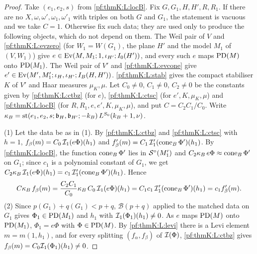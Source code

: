 \begin{proof}
Take $(e_1,e_2,s)$ from \ref{pf:thmK:L:locB}. Fix $G,G_1,H,H',R,R_1$. If there are no $X,\omega,\omega',\omega_1,
\omega'_1$ with triples on both $G$ and $G_1$, the statement is vacuous and we take $C=1$. Otherwise fix such data; they
are used only to produce the following objects, which do not depend on them. The Weil pair of $V$ and
\ref{pf:thmK:L:evzero} (for $W_1=W(G_1)$, the plane $H'$ and the model $M_1$ of $(V,W_1)$) give
$e\in\operatorname{Ev}(M,M_1;1,\iota_{H'};I_0(H'))$, and every such $e$ maps $\operatorname{PD}(M)$ onto $\operatorname{PD}(M_1)$. The Weil pair of $V'$
and \ref{pf:thmK:L:evcone} give $e'\in\operatorname{Ev}(M',M'_1;\iota_H,\iota_{H'};I_B(H,H'))$. \ref{pf:thmK:L:stab} gives the
compact stabiliser $K$ of $V'$ and Haar measures $\mu_K,\mu$. Let $C_0\ne0$, $C_1\ne0$, $C_2\ne0$ be the constants given by
\ref{pf:thmK:L:ctbz} (for $e$), \ref{pf:thmK:L:ctsc} (for $e',K,\mu_K,\mu$) and \ref{pf:thmK:L:locB} (for
$R,R_1,e,e',K,\mu_K,\mu$), and put $C=C_2C_1/C_0$. Write $\kappa_B=\operatorname{st}(e_1,e_2,s;\mathfrak b_H,\mathfrak
b_{H'};-k_B)\,L^{S_0}(k_B+1,\nu)$.

(1) Let the data be as in (1). By \ref{pf:thmK:L:ctbz} and \ref{pf:thmK:L:ctsc} with $h=1$,
$f_\beta(m)=C_0\,\mathcal{I}_1(e\Phi)(h_1)$ and $f'_\beta(m)=C_1\,\mathcal{I}'_1(\operatorname{cone}_B\Phi')(h_1)$. By \ref{pf:thmK:L:locB}, the
function $\operatorname{cone}_B\Phi'$ lies in $\mathcal{S}^{\circ}(M'_1)$ and $C_2\kappa_B\,e\Phi\approx\operatorname{cone}_B\Phi'$ on $G_1$; since $c_1$ is a
polynomial constant of $G_1$, we get $C_2\kappa_B\,\mathcal{I}_1(e\Phi)(h_1)=c_1\,\mathcal{I}'_1(\operatorname{cone}_B\Phi')(h_1)$. Hence
\[
C\kappa_B\,f_\beta(m)=\frac{C_2C_1}{C_0}\kappa_B\,C_0\,\mathcal{I}_1(e\Phi)(h_1)=C_1c_1\,\mathcal{I}'_1(\operatorname{cone}_B\Phi')(h_1)
=c_1f'_\beta(m).
\]
(2) Since $p(G_1)+q(G_1)<p+q$, $\mathcal B(p+q)$ applied to the matched data on $G_1$ gives $\Phi_1\in\operatorname{PD}(M_1)$ and $h_1$
with $\mathcal{I}_1(\Phi_1)(h_1)\ne0$. As $e$ maps $\operatorname{PD}(M)$ onto $\operatorname{PD}(M_1)$, $\Phi_1=e\Phi$ with $\Phi\in\operatorname{PD}(M)$. By
\ref{pf:thmK:L:levi} there is a Levi element $m=m(1,h_1)$, and for every splitting $(f_\alpha,f_\beta)$ of $\mathcal{I}(\Phi)$,
\ref{pf:thmK:L:ctbz} gives $f_\beta(m)=C_0\mathcal{I}_1(\Phi_1)(h_1)\ne0$.
\end{proof}

